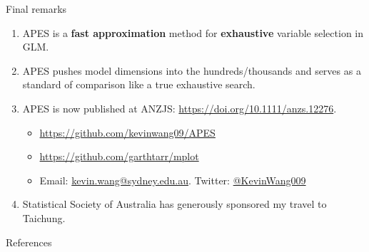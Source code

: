 \documentclass[12pt,aspectratio=169]{beamer}
\begin{document}
\begin{frame}{Final remarks}
\begin{enumerate}
	\item APES is a \textbf{fast approximation} method for \textbf{exhaustive} variable selection in GLM. 
	\item APES pushes model dimensions into the hundreds/thousands and serves as a standard of comparison like a true exhaustive search. 
	\item APES is now published at ANZJS: \url{https://doi.org/10.1111/anzs.12276}. 
	\begin{itemize}
		\item \href{https://github.com/kevinwang09/APES}{https://github.com/kevinwang09/APES}
		\item \href{https://github.com/garthtarr/mplot}{https://github.com/garthtarr/mplot}
		\item Email: \href{mailto:kevin.wang@sydney.edu.au}{kevin.wang@sydney.edu.au}. Twitter: \href{https://twitter.com/KevinWang009}{@KevinWang009}
	\end{itemize}
   
    \item Statistical Society of Australia has generously sponsored my travel to Taichung. 
\end{enumerate}
\end{frame}



\begin{frame}{References}

\scriptsize

\end{frame}
\end{document}
